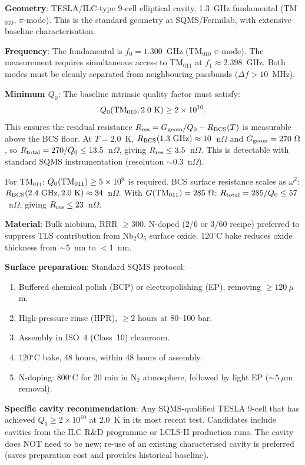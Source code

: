 \documentclass[11pt]{article}
\newcommand{\ee}[1]{\times 10^{#1}}
\theoremstyle{definition}
\theoremstyle{remark}
\begin{document}
\begin{tcolorbox}[colback=yellow!5!white, colframe=orange!60!black,
  title=\textbf{CAVITY SELECTION CRITERIA}]

\textbf{Geometry}: TESLA/ILC-type 9-cell elliptical cavity,
1.3~GHz fundamental (TM$_{010}$, $\pi$-mode). This is the standard
geometry at SQMS/Fermilab, with extensive baseline characterisation.

\textbf{Frequency}: The fundamental is $f_0 = 1.300$~GHz
(TM$_{010}$ $\pi$-mode). The measurement requires simultaneous
access to TM$_{011}$ at $f_1 \approx 2.398$~GHz. Both modes must
be cleanly separated from neighbouring passbands ($\Delta f > 10$~MHz).

\textbf{Minimum $Q_0$}: The baseline intrinsic quality factor must
satisfy:
\begin{equation}
Q_0({\rm TM}_{010}, 2.0~{\rm K}) \geq 2 \times 10^{10}.
\label{eq:Q0-min}
\end{equation}
This ensures the residual resistance
$R_{\rm res} = G_{\rm geom}/Q_0 - R_{\rm BCS}(T)$ is measurable
above the BCS floor. At $T = 2.0$~K, $R_{\rm BCS}(1.3~{\rm GHz})
\approx 10$~n$\Omega$ and $G_{\rm geom} = 270~\Omega$, so
$R_{\rm total} = 270/Q_0 \leq 13.5$~n$\Omega$, giving
$R_{\rm res} \leq 3.5$~n$\Omega$. This is detectable with standard
SQMS instrumentation (resolution $\sim 0.3$~n$\Omega$).

For TM$_{011}$: $Q_0({\rm TM}_{011}) \geq 5 \times 10^{9}$ is
required. BCS surface resistance scales as $\omega^2$:
$R_{\rm BCS}(2.4~{\rm GHz}, 2.0~{\rm K}) \approx 34$~n$\Omega$.
With $G({\rm TM}_{011}) = 285~\Omega$:
$R_{\rm total} = 285/Q_0 \leq 57$~n$\Omega$, giving
$R_{\rm res} \leq 23$~n$\Omega$.

\textbf{Material}: Bulk niobium, RRR $\geq 300$. N-doped
(2/6 or 3/60 recipe) preferred to suppress TLS contribution from
Nb$_2$O$_5$ surface oxide. 120$^\circ$C bake reduces oxide
thickness from $\sim$5~nm to $<$1~nm.

\textbf{Surface preparation}: Standard SQMS protocol:
\begin{enumerate}[nosep]
\item Buffered chemical polish (BCP) or electropolishing (EP),
  removing $\geq 120~\mu$m.
\item High-pressure rinse (HPR), $\geq 2$ hours at 80--100 bar.
\item Assembly in ISO~4 (Class~10) cleanroom.
\item 120$^\circ$C bake, 48 hours, within 48 hours of assembly.
\item N-doping: 800$^\circ$C for 20 min in N$_2$ atmosphere,
  followed by light EP ($\sim 5~\mu$m removal).
\end{enumerate}

\textbf{Specific cavity recommendation}: Any SQMS-qualified
TESLA 9-cell that has achieved $Q_0 \geq 2\ee{10}$ at 2.0~K
in its most recent test. Candidates include cavities from the
ILC R\&D programme or LCLS-II production runs. The cavity does
NOT need to be new; re-use of an existing characterised cavity
is preferred (saves preparation cost and provides historical
baseline).

\end{tcolorbox}
\end{document}
